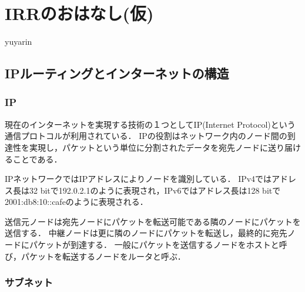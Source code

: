 

\chapter{IRRのおはなし(仮)}

\begin{flushright}
 yuyarin %
\end{flushright}

%

\section{IPルーティングとインターネットの構造}


\subsection{IP}

現在のインターネットを実現する技術の１つとしてIP(Internet Protocol)という通信プロトコルが利用されている．
IPの役割はネットワーク内のノード間の到達性を実現し，パケットという単位に分割されたデータを宛先ノードに送り届けることである．

IPネットワークではIPアドレスによりノードを識別している．
IPv4ではアドレス長は32 bitで192.0.2.1のように表現され，IPv6ではアドレス長は128 bitで2001:db8:10::cafeのように表現される．

送信元ノードは宛先ノードにパケットを転送可能である隣のノードにパケットを送信する．
中継ノードは更に隣のノードにパケットを転送し，最終的に宛先ノードにパケットが到達する．
一般にパケットを送信するノードをホストと呼び，パケットを転送するノードをルータと呼ぶ．

\subsection{サブネット}

